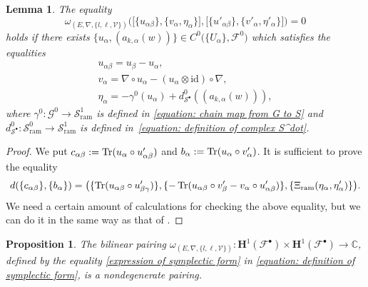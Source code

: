 \documentclass[pdftex]{sigma}
\numberwithin{equation}{section}
\newtheorem{Lemma}[Theorem]{Lemma}
\newtheorem{Proposition}[Theorem]{Proposition}
\newcommand{\Tr}{\mathop{\rm Tr}\nolimits}
\begin{document}
\begin{Lemma}
The equality
\[
 \omega_{ (E,\nabla,\{ l,\ell,{\mathcal V}\}) } \big(
 \big[ \{ u_{\alpha\beta}\},
 \{ v_{\alpha} , \eta_{\alpha} \} \big] ,
 \big[ \{ u'_{\alpha\beta}\},
 \{ v'_{\alpha} , \eta'_{\alpha} \} \big]
\big)=0
\]
holds
if there exists
$\{u_{\alpha},(a_{k,\alpha}(w))\}\in C^0\big(\{U_{\alpha}\},{\mathcal F}^0\big)$
which satisfies the equalities
\begin{gather*}
 u_{\alpha\beta} = u_{\beta}-u_{\alpha},
 \\
 v_{\alpha}= \nabla\circ u_{\alpha}-(u_{\alpha}\otimes\mathrm{id})\circ\nabla,
 \\
 \eta_{\alpha}=
 -\gamma^0(u_{\alpha})+d^0_{{\mathcal S}^{\bullet}}((a_{k,\alpha}(w))),
\end{gather*}
where $\gamma^0\colon {\mathcal G}^0\longrightarrow {\mathcal S}^1_{\mathrm{ram}}$
is defined in \eqref{equation: chain map from G to S} and
$d^0_{{\mathcal S}^{\bullet}} \colon {\mathcal S}^0_{\mathrm{ram}}
\longrightarrow {\mathcal S}^1_{\mathrm{ram}}$
is defined in~\eqref{equation: definition of complex S^dot}.
\end{Lemma}

\begin{proof}We put $c_{\alpha\beta}:=\Tr(u_{\alpha}\circ u'_{\alpha\beta})$
and $b_{\alpha}:=\Tr(u_{\alpha}\circ v'_{\alpha})$.
It is sufficient to prove the equality
\[
 d (\{c_{\alpha\beta}\},\{b_{\alpha}\})
 =
 \big(
 \{ \Tr(u_{\alpha\beta}\circ u'_{\beta\gamma})\},
 \{ {-}\Tr(u_{\alpha\beta}\circ v'_{\beta}-v_{\alpha}\circ u'_{\alpha\beta})\},
 \{\Xi_{\mathrm{ram}}( \eta_{\alpha} , \eta'_{\alpha} )
 \}\big).
\]
We need a certain amount of calculations for checking the above equality,
but we can do it in the same way as that of
\cite[pp.~37--39]{Inaba-3}.
\end{proof}

\begin{Proposition}\label{proposition: nondegenerate pairing on tangent space}
The bilinear pairing
$\omega_{ (E,\nabla,\{ l,\ell,{\mathcal V}\}) }\colon \mathbf{H}^1({\mathcal F}^{\bullet})
\times \mathbf{H}^1({\mathcal F}^{\bullet})
\longrightarrow \mathbb{C}$,
defined by the equality \eqref{expression of symplectic form}
in \eqref{equation: definition of symplectic form},
is a nondegenerate pairing.
\end{Proposition}
\end{document}
